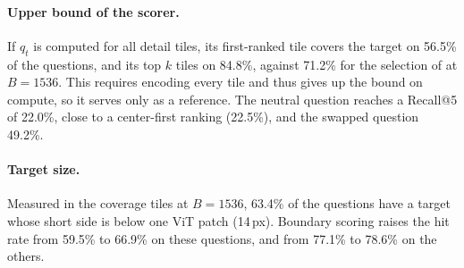 \paragraph{Upper bound of the scorer.}
If $q_t$ is computed for all detail tiles, its first-ranked tile covers the target on 56.5\% of the questions,
and its top $k$ tiles on 84.8\%, against 71.2\% for the selection of \method at $B=1536$. This requires encoding
every tile and thus gives up the bound on compute, so it serves only as a reference. The neutral question
reaches a Recall@5 of 22.0\%, close to a center-first ranking (22.5\%), and the swapped question 49.2\%.

\paragraph{Target size.}
Measured in the coverage tiles at $B=1536$, 63.4\% of the questions have a target whose short side is below one
ViT patch (14\,px). Boundary scoring raises the hit rate from 59.5\% to 66.9\% on these questions, and from 77.1\%
to 78.6\% on the others.
